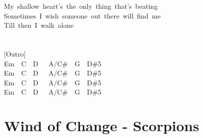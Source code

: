 \documentclass[]{book}
\let\stdsection\section
\renewcommand\section{\clearpage\stdsection}
\begin{document}
\hspace*{0.333em}\hspace*{0.333em}\hspace*{0.333em}\hspace*{0.333em}My~shallow~heart's~the~only~thing~that's~beating\\
\hspace*{0.333em}\hspace*{0.333em}\hspace*{0.333em}\hspace*{0.333em}Sometimes~I~wish~someone~out~there~will~find~me\\
\hspace*{0.333em}\hspace*{0.333em}\hspace*{0.333em}\hspace*{0.333em}Till~then~I~walk~alone\\
~\\
~\\
{[}Outro{]}\\
Em~~C~~D~~~A/C\#~~G~~D\#5\\
Em~~C~~D~~~A/C\#~~G~~D\#5\\
Em~~C~~D~~~A/C\#~~G~~D\#5\\
Em~~C~~D~~~A/C\#~~G~~D\#5\\

\hypertarget{wind-of-change---scorpions}{%
\section{Wind of Change - Scorpions}\label{wind-of-change---scorpions}}
\end{document}

